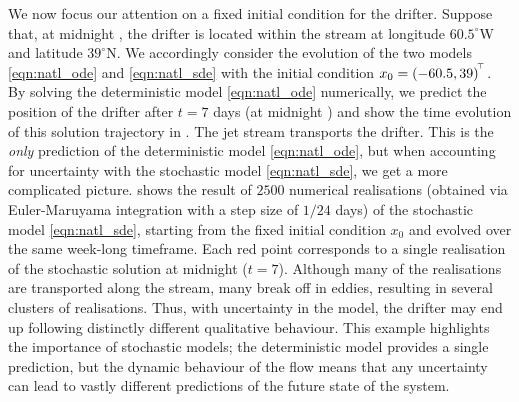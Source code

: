 We now focus our attention on a fixed initial condition for the drifter. %
Suppose that, at midnight , the drifter is located within the stream at longitude \(60.5^\circ\)W and latitude \(39^\circ\)N.
We accordingly consider the evolution of the two models \cref{eqn:natl_ode} and \cref{eqn:natl_sde} with the initial condition \(x_0 = (-60.5, 39)^{^{\!\top}}\).
By solving the deterministic model \cref{eqn:natl_ode} numerically, we predict the position of the drifter after \(t = 7\) days (at midnight ) and show the time evolution of this solution trajectory in .
The jet stream transports the drifter.
This is the \emph{only} prediction of the deterministic model \cref{eqn:natl_ode}, but when accounting for uncertainty with the stochastic model \cref{eqn:natl_sde}, we get a more complicated picture.
 shows the result of \(2500\) numerical realisations (obtained via Euler-Maruyama integration with a step size of \(1/24\) days) of the stochastic model \cref{eqn:natl_sde}, starting from the fixed initial condition \(x_0\) and evolved over the same week-long timeframe.
Each red point corresponds to a single realisation of the stochastic solution at midnight  (\(t = 7\)).
Although many of the realisations are transported along the stream, many break off in eddies, resulting in several clusters of realisations.
Thus, with uncertainty in the model, the drifter may end up following distinctly different qualitative behaviour.
This example highlights the importance of stochastic models; the deterministic model provides a single prediction, but the dynamic behaviour of the flow means that any uncertainty can lead to vastly different predictions of the future state of the system.

